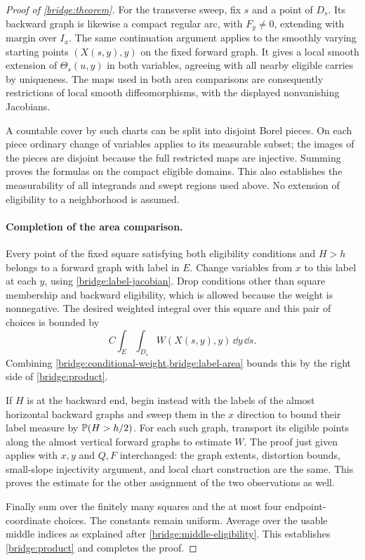 \begin{proof}[Proof of \cref{bridge:theorem}]
For the transverse sweep, fix $s$ and a point of $D_s$. Its backward
graph is likewise a compact regular arc, with $F_y\ne0$, extending
with margin over $I_x$. The same continuation argument applies to
the smoothly varying starting points $(X(s,y),y)$ on the fixed
forward graph. It gives a local smooth extension of
$\Theta_s(u,y)$ in both variables, agreeing with all nearby
eligible carries by uniqueness. The maps used in both area
comparisons are consequently restrictions of local smooth
diffeomorphisms, with the displayed nonvanishing Jacobians.

A countable cover by such charts can be split into disjoint Borel
pieces. On each piece ordinary change of variables applies to its
measurable subset; the images of the pieces are disjoint because
the full restricted maps are injective. Summing proves the formulas
on the compact eligible domains. This also establishes the
measurability of all integrands and swept regions used above.
No extension of eligibility to a neighborhood is assumed.

\paragraph{Completion of the area comparison.}
Every point of the fixed square satisfying both eligibility
conditions and $H>h$ belongs to a forward graph with label in $E$.
Change variables from $x$ to this label at each $y$, using
\cref{bridge:label-jacobian}. Drop conditions other than square
membership and backward eligibility, which is allowed because the
weight is nonnegative. The desired weighted integral over this
square and this pair of choices is bounded by
\[
 C\int_E\int_{D_s}W(X(s,y),y)\,\dd y\,\dd s.
\]
Combining \cref{bridge:conditional-weight,bridge:label-area} bounds
this by the right side of \cref{bridge:product}.

If $H$ is at the backward end, begin instead with the labels of the
almost horizontal backward graphs and sweep them in the $x$
direction to bound their label measure by $\mathbb{P}(H>h/2)$. For each
such graph, transport its eligible points along the almost vertical
forward graphs to estimate $W$. The proof just given applies with
$x,y$ and $Q,F$ interchanged: the graph extents, distortion bounds,
small-slope injectivity argument, and local chart construction are
the same. This proves the estimate for the other assignment of the
two observations as well.

Finally sum over the finitely many squares and the at most four
endpoint-coordinate choices. The constants remain uniform. Average
over the usable middle indices as explained after
\cref{bridge:middle-eligibility}. This establishes
\cref{bridge:product} and completes the proof.
\end{proof}

